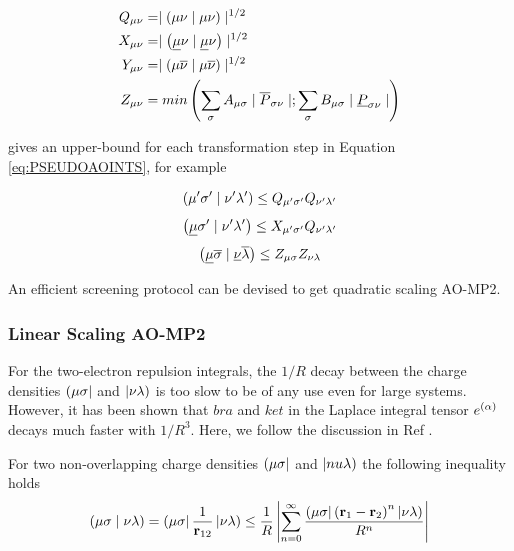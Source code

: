 \begin{equation}
\begin{split}
Q_{\mu\nu} &= \mid \left( \mu\nu \mid \mu\nu \right) \mid ^{1/2} \\
X_{\mu\nu} &= \mid \left( \underline{\mu}\nu \mid \underline{\mu}\nu \right) \mid ^{1/2} \\
Y_{\mu\nu} &= \mid \left( \mu\overline{\nu} \mid \mu\overline{\nu} \right) \mid ^{1/2} \\
Z_{\mu\nu} &= min\left( \sum_{\sigma} A_{\mu\sigma} \mid \overline{P}_{\sigma\nu} \mid; \sum_{\sigma} B_{\mu \sigma} \mid \underline{P}_{\sigma\nu} \mid \right)
\end{split}
\end{equation} 

\noindent gives an upper-bound for each transformation step in Equation \ref{eq:PSEUDOAOINTS}, for example 

\begin{equation}
\left( \mu'\sigma' \mid \nu'\lambda' \right) \leq Q_{\mu'\sigma'}Q_{\nu'\lambda'}
\end{equation}
\begin{equation}
\left( \underline{\mu}\sigma' \mid \nu'\lambda' \right) \leq X_{\mu'\sigma'}Q_{\nu'\lambda'}
\end{equation}
\begin{equation}
\left( \underline{\mu} \overline{\sigma} \mid \underline{\nu}\overline{\lambda} \right) \leq Z_{\mu\sigma} Z_{\nu\lambda}
\end{equation}

\noindent An efficient screening protocol can be devised \cite{Has1993} to get quadratic scaling AO-MP2.

\subsubsection{Linear Scaling AO-MP2}

For the two-electron repulsion integrals, the $1/R$ decay between the charge densities $\left( \mu\sigma \right\rvert$ and $\left\lvert \nu\lambda \right)$ is too slow to be of any use even for large systems. However, it has been shown \cite{Aya1999} that $bra$ and $ket$ in the Laplace integral tensor $e^{(\alpha)}$ decays much faster with $1/R^3$. Here, we follow the discussion in Ref \cite{Lam2005a}. 

For two non-overlapping charge densities $\left( \mu\sigma \right\rvert$ and $\left\lvert nu\lambda \right)$ the following inequality holds
\begin{equation}
\left( \mu\sigma \mid \nu\lambda \right) = \left( \mu\sigma \right\rvert\frac{1}{\mathbf{r}_{12}}\left\lvert \nu\lambda \right) \leq \frac{1}{R} \left\lvert \sum_{n=0}^{\infty} \frac{\left( \mu\sigma \right\rvert \left( \mathbf{r}_1 - \mathbf{r}_2 \right)^n \left\lvert \nu\lambda \right)}{R^n} \right\rvert
\label{eq:MBIESCREEN}
\end{equation}

